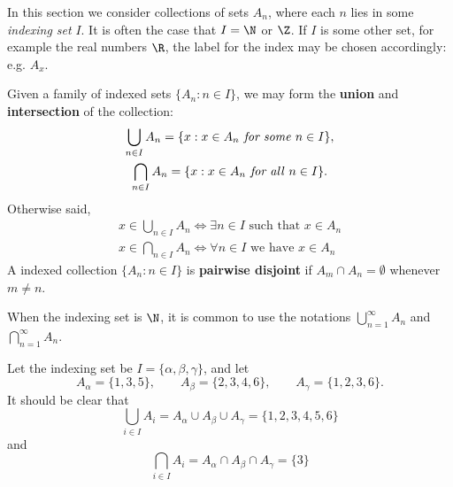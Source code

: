 In this section we consider collections of sets $A_n$, where each $n$ lies in some \emph{indexing set} $I$. It is often the case that $I=\N$ or $\Z$. If $I$ is some other set, for example the real numbers $\R$, the label for the index may be chosen accordingly: e.g. $A_x$.


\begin{defn}\label{defn:indexed}
Given a family of indexed sets $\{A_n:n\in I\}$, we may form the \textbf{union} and \textbf{intersection} of the collection:
\begin{gather*}
\bigcup_{n\in I}A_n=\{x:x\in A_n\text{\emph{ for some} }n\in I\},\\
\bigcap_{n\in I}A_n=\{x:x\in A_n\text{\emph{ for all} }n\in I\}.
\end{gather*}
Otherwise said,
\begin{gather*}
x\in\bigcup_{n\in I}A_n\iff \exists n\in I\text{ such that }x\in A_n\\
x\in\bigcap_{n\in I}A_n\iff \forall n\in I\text{ we have }x\in A_n
\end{gather*}
A indexed collection $\{A_n:n\in I\}$ is \textbf{pairwise disjoint} if $A_m\cap A_n=\emptyset$ whenever $m\neq n$.
\end{defn}

\noindent When the indexing set is $\N$, it is common to use the notations $\bigcup\limits_{n=1}^\infty A_n$ and $\bigcap\limits_{n=1}^\infty A_n$.

\begin{example}
Let the indexing set be $I=\{\alpha,\beta,\gamma\}$, and let
\[A_\alpha=\{1,3,5\},\qquad A_\beta=\{2,3,4,6\},\qquad A_\gamma=\{1,2,3,6\}.\]
It should be clear that
\[\bigcup_{i\in I}A_i=A_\alpha\cup A_\beta\cup A_\gamma=\{1,2,3,4,5,6\}\]
and
\[\bigcap_{i\in I}A_i=A_\alpha\cap A_\beta\cap A_\gamma=\{3\}\]
\end{example}

